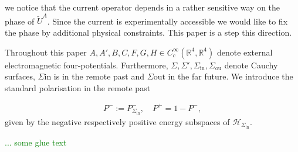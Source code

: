 \documentclass[a4paper,11pt]{article}
\begin{document}
we notice that the current operator depends in a rather sensitive way on the phase of \(\tilde{U}^A\). Since the current is experimentally accessible 
we would like to fix the phase by additional physical constraints. This paper is a step this direction. 

Throughout this paper \(A,A',B,C,F,G,H\in C_c^\infty(\mathbb{R}^4,\mathbb{R}^4)\) denote external electromagnetic four-potentials. Furthermore, 
\(\Sigma, \Sigma', \Sigma_{\mathrm{in}}, \Sigma_{\mathrm{ou}}\)  denote Cauchy surfaces, \(\Sigma{\mathrm{in}}\) is in the remote past and 
\(\Sigma{\mathrm{out}}\) in the far future. We introduce the standard polarisation in the remote past

\begin{align}
P^-:=P_{\Sigma_{\mathrm{in}}}^{-}, \quad P^+=1-P^-,
\end{align}
given by the negative respectively positive energy subspaces of \(\mathcal{H}_{\Sigma_{\mathrm{in}}}\). 

\textcolor{green}{... some glue text}
\end{document}
